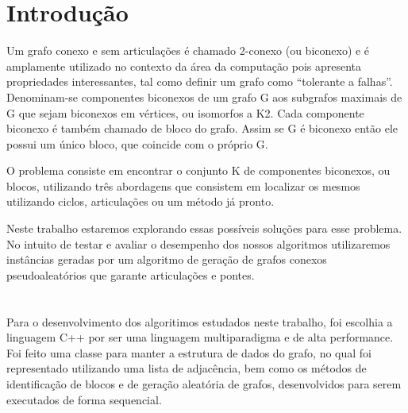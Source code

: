 \section{\esp Introdução}

Um grafo conexo e sem articulações é chamado 2-conexo (ou biconexo) e é amplamente utilizado no contexto da área da computação pois apresenta propriedades interessantes, tal como definir um grafo como “tolerante a falhas”. Denominam-se componentes biconexos de um grafo G aos subgrafos maximais de G que sejam biconexos em vértices, ou isomorfos a K2. Cada componente biconexo é também chamado de bloco do grafo. Assim se G é biconexo então ele possui um único bloco, que coincide com o próprio G. 


O problema consiste em encontrar o conjunto K de componentes biconexos, ou blocos, utilizando três abordagens que consistem em localizar os mesmos utilizando ciclos, articulações ou um método já pronto.


Neste trabalho estaremos explorando essas possíveis soluções para esse problema. No intuito de testar e avaliar o desempenho dos nossos algoritmos utilizaremos instâncias geradas por um algoritmo de geração de grafos conexos pseudoaleatórios que garante articulações e pontes.

\section{}

Para o desenvolvimento dos algoritimos estudados neste trabalho, foi escolhia a linguagem C++ por ser uma linguagem multiparadigma e de alta performance. 
Foi feito uma classe para manter a estrutura de dados do grafo, no qual foi representado utilizando uma lista de adjacência, bem como os métodos de identificação de blocos e de geração aleatória de grafos, desenvolvidos para serem executados de forma sequencial.


